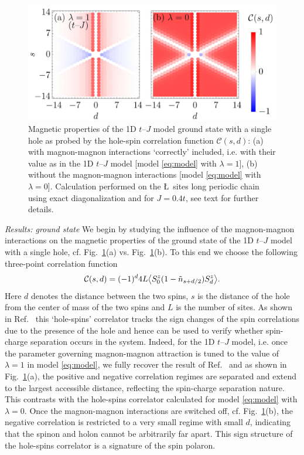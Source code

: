 \documentclass[%
 reprint,
 amsmath,amssymb,
 aps,
prl,
]{revtex4-1}
\begin{document}
\begin{figure}[t!]
    \includegraphics[width=\columnwidth]
    {fig_1.jpg}
  \caption{Magnetic properties of the 1D $t$--$J$ model ground state with a single hole as probed by the hole-spin correlation function $\mathcal{C}(s, d)$: (a) with  magnon-magnon interactions `correctly' included, i.e. with their value as in the 1D $t$--$J$ model [model \eqref{eq:model} with $\lambda = 1$], (b) without the magnon-magnon interactions [model \eqref{eq:model} with $\lambda = 0$]. Calculation performed on the \L~sites long periodic chain using exact diagonalization and for $J=0.4t$, see text for further details.
}
\label{fig:correlator}
\end{figure}

{\it Results: ground state} We begin by studying the influence of the magnon-magnon interactions on the magnetic properties of the ground state of the 1D $t$--$J$ model with a single hole, cf. Fig.~\ref{fig:correlator}(a) vs. Fig.~\ref{fig:correlator}(b). To this end we choose the following 
three-point correlation function 
\begin{align}
\mathcal{C} (s,d) = (-1)^{d} 4 L \big{\langle} S_0^z  (1- \tilde n_{s+d/2})   S_{d}^z \big{\rangle}.
\end{align}
Here $d$ denotes the distance between the two spins, $s$ is the distance of the hole from the center of mass of the two spins and $L$ is the number of sites. As shown in Ref.~ this `hole-spins' correlator tracks
the sign changes of the spin correlations due to the presence of the hole
and hence can be used to verify whether  spin-charge separation occurs in the system. Indeed, for the 1D $t$--$J$ model, i.e. once the parameter governing magnon-magnon attraction is tuned to the value of $\lambda = 1$ in model \eqref{eq:model}, we fully recover the result of Ref.~ and 
as shown in Fig.~\ref{fig:correlator}(a), the positive and negative correlation regimes are separated and extend to the largest accessible distance, reflecting the spin-charge separation nature.
This contrasts with the hole-spins correlator calculated for model \eqref{eq:model} with $\lambda =0$. Once the magnon-magnon interactions are switched off, cf. Fig.~\ref{fig:correlator}(b),
the negative correlation is restricted to a very small regime with small $d$, indicating that the spinon and holon cannot be arbitrarily far apart.
This sign structure of the hole-spins correlator is a signature of the spin polaron.
\end{document}
